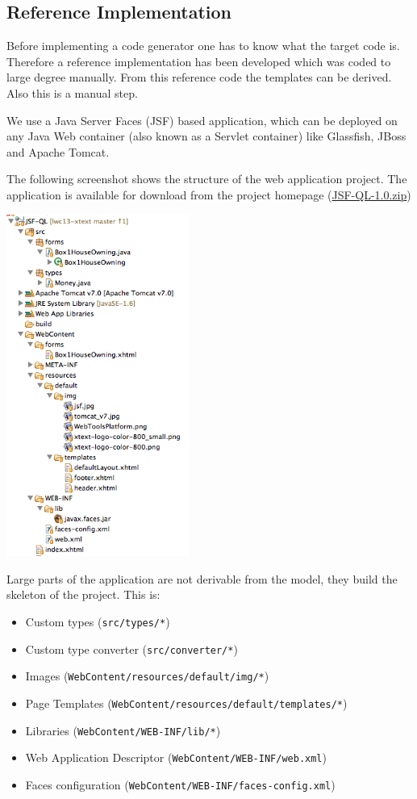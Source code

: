 \subsection{Reference Implementation}

Before implementing a code generator one has to know what the target code is. Therefore a reference implementation has been
developed which was coded to large degree manually. From this reference code the templates can be derived. Also this is a
manual step.

We use a Java Server Faces (JSF) based application, which can be deployed on any
Java Web container (also known as a Servlet container) like Glassfish, JBoss and Apache Tomcat.

The following screenshot shows the structure of the web application project. The application is available for download from the project 
homepage (\href{http://lwc13-xtext.eclipselabs.org.codespot.com/files/JSF-QL-1.0.zip}{JSF-QL-1.0.zip})

\includegraphics[width=6cm]{./images/chapter02/referenceimpl_projecttree.png}

Large parts of the application are not derivable from the model, they build the skeleton of the project. This is:
\begin{itemize}
\item Custom types (\texttt{src/types/*})
\item Custom type converter (\texttt{src/converter/*})
\item Images (\texttt{WebContent/resources/default/img/*})
\item Page Templates (\texttt{WebContent/resources/default/templates/*})
\item Libraries (\texttt{WebContent/WEB-INF/lib/*})
\item Web Application Descriptor (\texttt{WebContent/WEB-INF/web.xml})
\item Faces configuration (\texttt{WebContent/WEB-INF/faces-config.xml})
\end{itemize}


